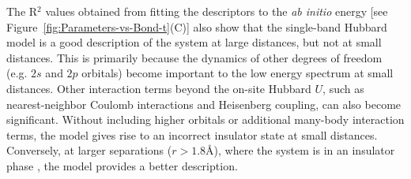 The R$^2$ values obtained from fitting the descriptors to the \textit{ab initio} energy [see Figure~\ref{fig:Parameters-vs-Bond-t}(C)] also show that the single-band Hubbard model is a good description of the system at large distances, but not at small distances. 
This is primarily because the dynamics of other degrees of freedom (e.g. $2s$ and $2p$ orbitals) become important to the low energy spectrum at small distances. Other interaction terms beyond the on-site Hubbard $U$, such as nearest-neighbor Coulomb interactions and Heisenberg coupling, can also become significant. 
Without including higher orbitals or additional many-body interaction terms, the model gives rise to an incorrect insulator state at small distances. 
Conversely, at larger separations ($r>1.8$\AA), where the system is in an insulator phase \cite{Stella2011}, the model provides a better description. 

